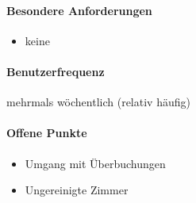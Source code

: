 \paragraph{Besondere Anforderungen}
\begin{itemize}
	\item keine
\end{itemize}

\paragraph{Benutzerfrequenz}
mehrmals wöchentlich (relativ häufig)

\paragraph{Offene Punkte}
\begin{itemize}
	\item Umgang mit Überbuchungen
	\item Ungereinigte Zimmer
\end{itemize}

\newpage

